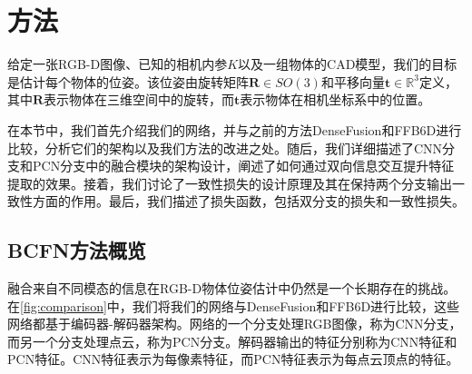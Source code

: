 \section{方法}

给定一张RGB-D图像、已知的相机内参$K$以及一组物体的CAD模型，我们的目标是估计每个物体的位姿。该位姿由旋转矩阵$\mathbf{R} \in SO(3)$和平移向量$\mathbf{t} \in \mathbb{R}^3$定义，其中$\mathbf{R}$表示物体在三维空间中的旋转，而$\mathbf{t}$表示物体在相机坐标系中的位置。

在本节中，我们首先介绍我们的网络，并与之前的方法DenseFusion\cite{wang2019densefusion}和FFB6D\cite{he2021ffb6d}进行比较，分析它们的架构以及我们方法的改进之处。随后，我们详细描述了CNN分支和PCN分支中的融合模块的架构设计，阐述了如何通过双向信息交互提升特征提取的效果。接着，我们讨论了一致性损失的设计原理及其在保持两个分支输出一致性方面的作用。最后，我们描述了损失函数，包括双分支的损失和一致性损失。

\subsection{BCFN方法概览}

融合来自不同模态的信息在RGB-D物体位姿估计中仍然是一个长期存在的挑战。在\autoref{fig:comparison}中，我们将我们的网络与DenseFusion\cite{wang2019densefusion}和FFB6D\cite{he2021ffb6d}进行比较，这些网络都基于编码器-解码器架构。网络的一个分支处理RGB图像，称为CNN分支，而另一个分支处理点云，称为PCN分支。解码器输出的特征分别称为CNN特征和PCN特征。CNN特征表示为每像素特征，而PCN特征表示为每点云顶点的特征。


